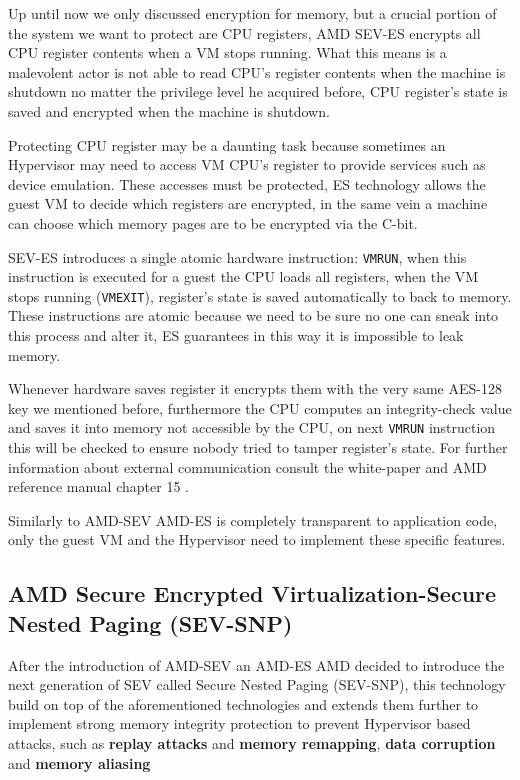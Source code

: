 \documentclass[twocolumn]{article}
\begin{document}
    Up until now we only discussed encryption for memory, but a crucial portion of the system we want to protect are CPU registers, AMD SEV-ES encrypts all CPU register contents when a VM stops running. What this means is a malevolent actor is not able to read CPU's register contents when the machine is shutdown no matter the privilege level he acquired before, CPU register's state is saved and encrypted when the machine is shutdown.

    Protecting CPU register may be a daunting task because sometimes an Hypervisor may need to access VM CPU's register to provide services such as device emulation. These accesses must be protected, ES technology allows the guest VM to decide which registers are encrypted, in the same vein a machine can choose which memory pages are to be encrypted via the C-bit.

    SEV-ES introduces a single atomic hardware instruction: \texttt{VMRUN}, when this instruction is executed for a guest the CPU loads all registers, when the VM stops running (\texttt{VMEXIT}), register's state is saved automatically to  back to memory. These instructions are atomic because we need to be sure no one can sneak into this process and alter it, ES guarantees in this way it is impossible to leak memory.

    Whenever hardware saves register it encrypts them with the very same AES-128 key we mentioned before, furthermore the CPU computes an integrity-check value and saves it into memory not accessible by the CPU, on next \texttt{VMRUN} instruction this will be checked to ensure nobody tried to tamper register's state. For further information about external communication consult the white-paper \cite{protecting-registers} and AMD reference manual chapter 15 \cite{architecture-reference}.

    Similarly to AMD-SEV AMD-ES is completely transparent to application code, only the guest VM and the Hypervisor need to implement these specific features.

\subsection{AMD Secure Encrypted Virtualization-Secure Nested Paging (SEV-SNP)}

    After the introduction of AMD-SEV an AMD-ES AMD decided to introduce the next generation of SEV called Secure Nested Paging (SEV-SNP), this technology build on top of the aforementioned technologies and extends them further to implement strong memory integrity protection to prevent Hypervisor based attacks, such as \textbf{replay attacks} and \textbf{memory remapping}, \textbf{data corruption} and \textbf{memory aliasing}
\end{document}
